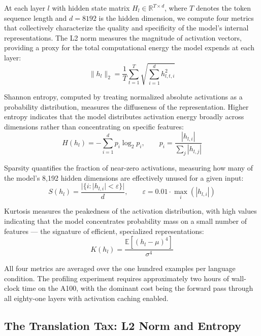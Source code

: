 \documentclass[11pt]{article}
\begin{document}
At each layer $l$ with hidden state matrix $H_l \in \mathbb{R}^{T \times d}$, where $T$ denotes the token sequence length and $d = 8192$ is the hidden dimension, we compute four metrics that collectively characterize the quality and specificity of the model's internal representations. The L2 norm measures the magnitude of activation vectors, providing a proxy for the total computational energy the model expends at each layer:
\begin{equation}
\|h_l\|_2 = \frac{1}{T} \sum_{t=1}^{T} \sqrt{\sum_{i=1}^{d} h_{l,t,i}^2}
\label{eq:l2norm}
\end{equation}

Shannon entropy, computed by treating normalized absolute activations as a probability distribution, measures the diffuseness of the representation. Higher entropy indicates that the model distributes activation energy broadly across dimensions rather than concentrating on specific features:
\begin{equation}
H(h_l) = -\sum_{i=1}^{d} p_i \log_2 p_i, \qquad p_i = \frac{|h_{l,i}|}{\sum_j |h_{l,j}|}
\label{eq:entropy}
\end{equation}

Sparsity quantifies the fraction of near-zero activations, measuring how many of the model's 8,192 hidden dimensions are effectively unused for a given input:
\begin{equation}
S(h_l) = \frac{|\{i : |h_{l,i}| < \varepsilon\}|}{d}, \qquad \varepsilon = 0.01 \cdot \max_i(|h_{l,i}|)
\label{eq:sparsity}
\end{equation}

Kurtosis measures the peakedness of the activation distribution, with high values indicating that the model concentrates probability mass on a small number of features --- the signature of efficient, specialized representations:
\begin{equation}
K(h_l) = \frac{\mathbb{E}\left[(h_l - \mu)^4\right]}{\sigma^4}
\label{eq:kurtosis}
\end{equation}

All four metrics are averaged over the one hundred examples per language condition. The profiling experiment requires approximately two hours of wall-clock time on the A100, with the dominant cost being the forward pass through all eighty-one layers with activation caching enabled.

\subsection{The Translation Tax: L2 Norm and Entropy}
\label{sec:translation_tax}
\end{document}

